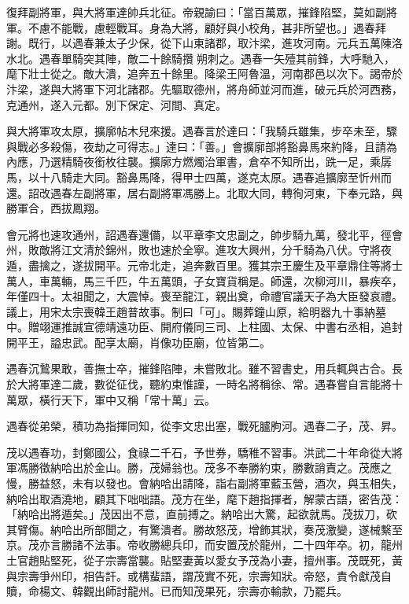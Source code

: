 \begin{pinyinscope}
復拜副將軍，與大將軍達帥兵北征。帝親諭曰：「當百萬眾，摧鋒陷堅，莫如副將軍。不慮不能戰，慮輕戰耳。身為大將，顧好與小校角，甚非所望也。」遇春拜謝。既行，以遇春兼太子少保，從下山東諸郡，取汴梁，進攻河南。元兵五萬陳洛水北。遇春單騎突其陣，敵二十餘騎攢朔刺之。遇春一矢殪其前鋒，大呼馳入，麾下壯士從之。敵大潰，追奔五十餘里。降梁王阿魯溫，河南郡邑以次下。謁帝於汴梁，遂與大將軍下河北諸郡。先驅取德州，將舟師並河而進，破元兵於河西務，克通州，遂入元都。別下保定、河間、真定。

與大將軍攻太原，擴廓帖木兒來援。遇春言於達曰：「我騎兵雖集，步卒未至，驟與戰必多殺傷，夜劫之可得志。」達曰：「善。」會擴廓部將豁鼻馬來約降，且請為內應，乃選精騎夜銜枚往襲。擴廓方燃燭治軍書，倉卒不知所出，跣一足，乘孱馬，以十八騎走大同。豁鼻馬降，得甲士四萬，遂克太原。遇春追擴廓至忻州而還。詔改遇春左副將軍，居右副將軍馮勝上。北取大同，轉徇河東，下奉元路，與勝軍合，西拔鳳翔。

會元將也速攻通州，詔遇春還備，以平章李文忠副之，帥步騎九萬，發北平，徑會州，敗敵將江文清於錦州，敗也速於全寧。進攻大興州，分千騎為八伏。守將夜遁，盡擒之，遂拔開平。元帝北走，追奔數百里。獲其宗王慶生及平章鼎住等將士萬人，車萬輛，馬三千匹，牛五萬頭，子女寶貨稱是。師還，次柳河川，暴疾卒，年僅四十。太祖聞之，大震悼。喪至龍江，親出奠，命禮官議天子為大臣發哀禮。議上，用宋太宗喪韓王趙普故事。制曰「可」。賜葬鐘山原，給明器九十事納墓中。贈翊運推誠宣德靖遠功臣、開府儀同三司、上柱國、太保、中書右丞相，追封開平王，謚忠武。配享太廟，肖像功臣廟，位皆第二。

遇春沉鷙果敢，善撫士卒，摧鋒陷陣，未嘗敗北。雖不習書史，用兵輒與古合。長於大將軍達二歲，數從征伐，聽約束惟謹，一時名將稱徐、常。遇春嘗自言能將十萬眾，橫行天下，軍中又稱「常十萬」云。

遇春從弟榮，積功為指揮同知，從李文忠出塞，戰死臚朐河。遇春二子，茂、昇。

茂以遇春功，封鄭國公，食祿二千石，予世券，驕稚不習事。洪武二十年命從大將軍馮勝徵納哈出於金山。勝，茂婦翁也。茂多不奉勝約束，勝數誚責之。茂應之慢，勝益怒，未有以發也。會納哈出請降，詣右副將軍藍玉營，酒次，與玉相失，納哈出取酒澆地，顧其下咄咄語。茂方在坐，麾下趙指揮者，解蒙古語，密告茂：「納哈出將遁矣。」茂因出不意，直前搏之。納哈出大驚，起欲就馬。茂拔刀，砍其臂傷。納哈出所部聞之，有驚潰者。勝故怒茂，增飾其狀，奏茂激變，遂械繫至京。茂亦言勝諸不法事。帝收勝總兵印，而安置茂於龍州，二十四年卒。初，龍州土官趙貼堅死，從子宗壽當襲。貼堅妻黃以愛女予茂為小妻，擅州事。茂既死，黃與宗壽爭州印，相告訐。或構蜚語，謂茂實不死，宗壽知狀。帝怒，責令獻茂自贖，命楊文、韓觀出師討龍州。已而知茂果死，宗壽亦輸款，乃罷兵。


\end{pinyinscope}
